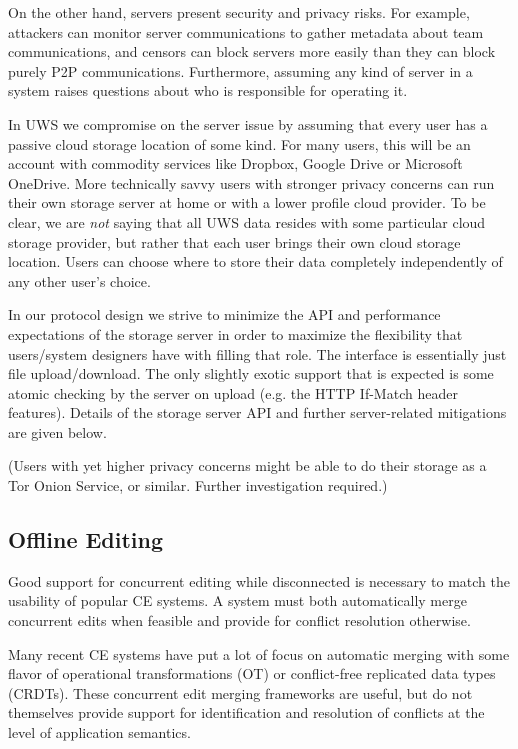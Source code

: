 \documentclass{article}
\begin{document}
On the other hand, servers present security and privacy risks.
For example, attackers can monitor server communications to gather metadata about team communications, and censors can block servers more easily than they can block purely P2P communications.
Furthermore, assuming any kind of server in a system raises questions about who is responsible for operating it.

In UWS we compromise on the server issue by assuming that every user has a passive cloud storage location of some kind.
For many users, this will be an account with commodity services like Dropbox, Google Drive or Microsoft OneDrive.
More technically savvy users with stronger privacy concerns can run their own storage server at home or with a lower profile cloud provider.
To be clear, we are \emph{not} saying that all UWS data resides with some particular cloud storage provider, but rather that each user brings their own cloud storage location.
Users can choose where to store their data completely independently of any other user's choice.

In our protocol design we strive to minimize the API and performance expectations of the storage server in order to maximize the flexibility that users/system designers have with filling that role.
The interface is essentially just file upload/download.
The only slightly exotic support that is expected is some atomic checking by the server on upload (e.g. the HTTP If-Match header features).
Details of the storage server API and further server-related mitigations are given below.

(Users with yet higher privacy concerns might be able to do their storage as a Tor Onion Service, or similar.
Further investigation required.)

\subsection{Offline Editing}

Good support for concurrent editing while disconnected is necessary to match the usability of popular CE systems.
A system must both automatically merge concurrent edits when feasible and provide for conflict resolution otherwise.

Many recent CE systems have put a lot of focus on automatic merging with some flavor of operational transformations (OT) or conflict-free replicated data types (CRDTs).
These concurrent edit merging frameworks are useful, but do not themselves provide support for identification and resolution of conflicts at the level of application semantics.
\end{document}
